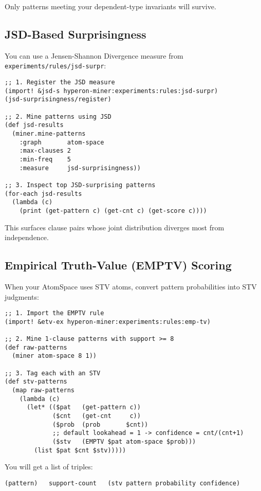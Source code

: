 Only patterns meeting your dependent-type invariants will survive.

\subsection{JSD-Based Surprisingness}

You can use a Jensen-Shannon Divergence measure from \texttt{experiments/rules/jsd-surpr}:

\begin{verbatim}
;; 1. Register the JSD measure
(import! &jsd-s hyperon-miner:experiments:rules:jsd-surpr)
(jsd-surprisingness/register)

;; 2. Mine patterns using JSD
(def jsd-results
  (miner.mine-patterns
    :graph       atom-space
    :max-clauses 2
    :min-freq    5
    :measure     jsd-surprisingness))

;; 3. Inspect top JSD-surprising patterns
(for-each jsd-results
  (lambda (c)
    (print (get-pattern c) (get-cnt c) (get-score c))))
\end{verbatim}

This surfaces clause pairs whose joint distribution diverges most from independence.

\subsection{Empirical Truth-Value (EMPTV) Scoring}

When your AtomSpace uses STV atoms, convert pattern probabilities into STV judgments:

\begin{verbatim}
;; 1. Import the EMPTV rule
(import! &etv-ex hyperon-miner:experiments:rules:emp-tv)

;; 2. Mine 1-clause patterns with support >= 8
(def raw-patterns
  (miner atom-space 8 1))

;; 3. Tag each with an STV
(def stv-patterns
  (map raw-patterns
    (lambda (c)
      (let* (($pat   (get-pattern c))
             ($cnt   (get-cnt     c))
             ($prob  (prob       $cnt))
             ;; default lookahead = 1 -> confidence = cnt/(cnt+1)
             ($stv   (EMPTV $pat atom-space $prob)))
        (list $pat $cnt $stv)))))
\end{verbatim}

You will get a list of triples:

\begin{verbatim}
(pattern)   support-count   (stv pattern probability confidence)
\end{verbatim}

